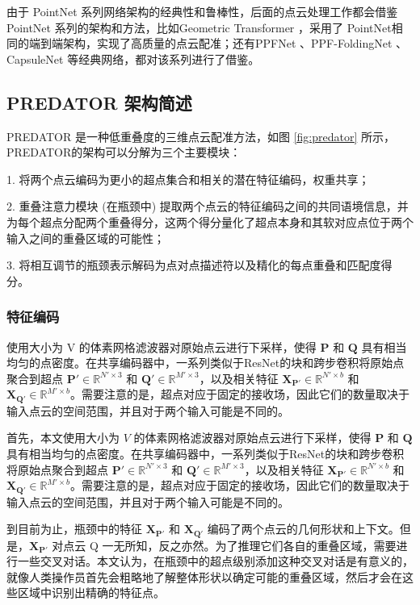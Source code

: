 由于 PointNet 系列网络架构的经典性和鲁棒性，后面的点云处理工作都会借鉴 PointNet 系列的架构和方法，比如Geometric Transformer\cite{qin2022geometric} ，采用了 PointNet相同的端到端架构，实现了高质量的点云配准；还有PPFNet\cite{deng2018ppf} 、PPF-FoldingNet\cite{deng2018ppfnet} 、CapsuleNet\cite{sabour2017dynamic} 等经典网络，都对该系列进行了借鉴。

\subsection{PREDATOR 架构简述}
PREDATOR\cite{huang2021predator} 是一种低重叠度的三维点云配准方法，如图 \ref{fig:predator} 所示，PREDATOR的架构可以分解为三个主要模块：

1. 将两个点云编码为更小的超点集合和相关的潜在特征编码，权重共享；

2. 重叠注意力模块 (在瓶颈中) 提取两个点云的特征编码之间的共同语境信息，并为每个超点分配两个重叠得分，这两个得分量化了超点本身和其软对应点位于两个输入之间的重叠区域的可能性；

3. 将相互调节的瓶颈表示解码为点对点描述符以及精化的每点重叠和匹配度得分。

\subsubsection{特征编码}使用大小为 V 的体素网格滤波器对原始点云进行下采样，使得 $\boldsymbol{P}$ 和 $\boldsymbol{Q}$ 具有相当均匀的点密度。在共享编码器中，一系列类似于ResNet的块和跨步卷积将原始点聚合到超点 $\boldsymbol{P'} \in \mathbb{R}^{N' \times 3}$ 和 $\boldsymbol{Q'} \in \mathbb{R}^{M' \times 3}$，以及相关特征 $\boldsymbol{X_{P'}} \in \mathbb{R}^{N' \times b}$ 和 $\boldsymbol{X_{Q'}} \in \mathbb{R}^{M' \times b}$。需要注意的是，超点对应于固定的接收场，因此它们的数量取决于输入点云的空间范围，并且对于两个输入可能是不同的。

首先，本文使用大小为 $V$ 的体素网格滤波器对原始点云进行下采样，使得 $\boldsymbol{P}$ 和 $\boldsymbol{Q}$ 具有相当均匀的点密度。在共享编码器中，一系列类似于ResNet的块和跨步卷积将原始点聚合到超点 $\boldsymbol{P'} \in \mathbb{R}^{N' \times 3}$ 和 $\boldsymbol{Q'} \in \mathbb{R}^{M' \times 3}$，以及相关特征 $\boldsymbol{X_{P'}} \in \mathbb{R}^{N' \times b}$ 和 $\boldsymbol{X_{Q'}} \in \mathbb{R}^{M' \times b}$。需要注意的是，超点对应于固定的接收场，因此它们的数量取决于输入点云的空间范围，并且对于两个输入可能是不同的。

到目前为止，瓶颈中的特征 $\boldsymbol{X_{P'}}$ 和 $\boldsymbol{X_{Q'}}$ 编码了两个点云的几何形状和上下文。但是，$\boldsymbol{X_{P'}}$ 对点云 Q 一无所知，反之亦然。为了推理它们各自的重叠区域，需要进行一些交叉对话。本文认为，在瓶颈中的超点级别添加这种交叉对话是有意义的，就像人类操作员首先会粗略地了解整体形状以确定可能的重叠区域，然后才会在这些区域中识别出精确的特征点。

